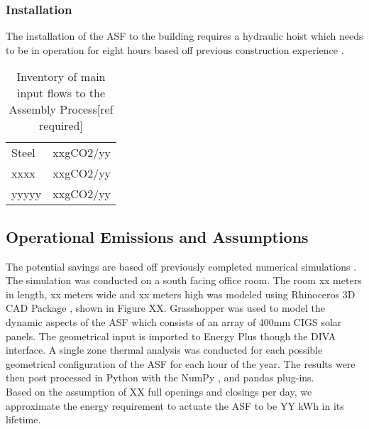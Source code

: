 \subsubsection*{Installation}

The installation of the ASF to the building requires a hydraulic hoist which needs to be in operation for eight hours based off previous construction experience \cite{jayathissa2015abs}. \\

\begin{table}[H]
\centering
\begin{tabular}{ll}
\hline
Steel & xxgCO2/yy \\
xxxx  & xxgCO2/yy \\
yyyyy & xxgCO2/yy \\
\hline
\end{tabular}
\caption{Inventory of main input flows to the Assembly Process[ref required]}
\label{tab:AssemblyInv}
\end{table}


\subsection{Operational Emissions and Assumptions}

The potential savings are based off previously completed numerical simulations \cite{jayathissa2015abs}. The simulation was conducted on a south facing office room. The room xx meters in length, xx meters wide and xx meters high was modeled using Rhinoceros 3D CAD Package \cite{Rhino}, shown in Figure XX. Grasshopper \cite{grasshopper} was used to model the dynamic aspects of the ASF which consists of an array of 400mm CIGS solar panels. The geometrical input is imported to Energy Plus \cite{energyplus} though the DIVA \cite{DIVA} interface. A single zone thermal analysis was conducted for each possible geometrical configuration of the ASF for each hour of the year. The results were then post processed in Python \cite{python} with the NumPy \cite{numpy}, and pandas \cite{pandas} plug-ins. \\

Based on the assumption of XX full openings and closings per day, we approximate the energy requirement to actuate the ASF to be YY kWh in its lifetime.\\

